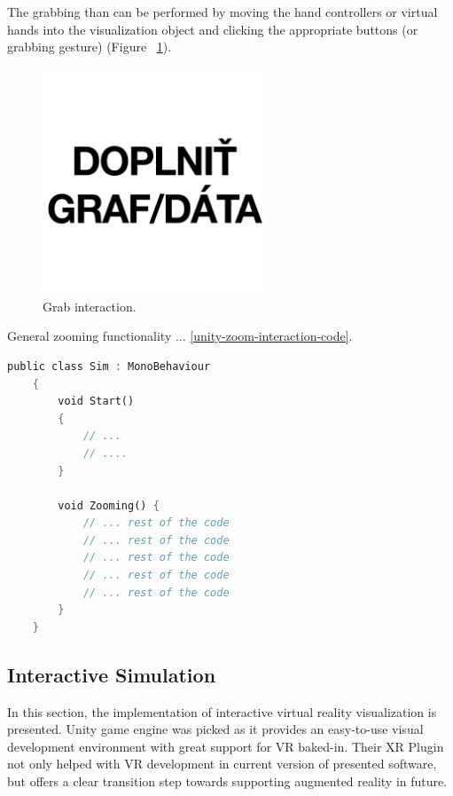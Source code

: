 The grabbing than can be performed by moving the hand controllers or virtual hands into the visualization object and clicking the appropriate buttons (or grabbing gesture) (Figure~ \ref{fig:grab-interaction}).

\begin{figure}[!ht]
	\centering
	\includegraphics[width=0.6\textwidth]{figures/empty.jpg}
	\caption{Grab interaction.}
	\label{fig:grab-interaction}
\end{figure}

General zooming functionality ... \ref{unity-zoom-interaction-code}.

\begin{lstlisting}[language=Rust, caption="Zooming interaction code.", label=unity-zoom-interaction-code]
	public class Sim : MonoBehaviour
	{
		void Start()
		{
			// ...
			// ....
		}
		
		void Zooming() {
			// ... rest of the code
			// ... rest of the code
			// ... rest of the code
			// ... rest of the code
			// ... rest of the code
		}
	}
\end{lstlisting}




\subsection{Interactive Simulation}
In this section, the implementation of interactive virtual reality visualization is presented. Unity game engine was picked as it provides an easy-to-use visual development environment with great support for VR baked-in. Their XR Plugin not only helped with VR development in current version of presented software, but offers a clear transition step towards supporting augmented reality in future.

